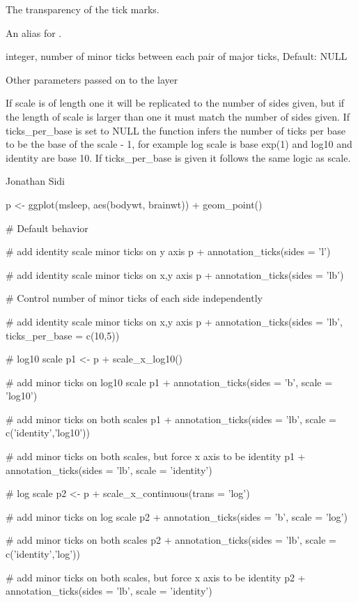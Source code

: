 \documentclass[a4paper]{book}
\begin{document}
\begin{Arguments}
\begin{ldescription}
\item[\code{alpha}] The transparency of the tick marks.

\item[\code{color}] An alias for .

\item[\code{ticks\_per\_base}] integer, number of minor ticks between each pair of major ticks, Default: NULL

\item[\code{...}] Other parameters passed on to the layer
\end{ldescription}
\end{Arguments}
%
\begin{Details}
If scale is of length one it will be replicated to the number of sides given, but if the
length of scale is larger than one it must match the number of sides given.
If ticks\_per\_base is set to NULL the function infers the number of ticks per base to be
the base of the scale - 1, for example log scale is base exp(1) and
log10 and identity are base 10. If ticks\_per\_base is given it follows the same logic as scale.
\end{Details}
%
\begin{Author}
Jonathan Sidi
\end{Author}
%
\begin{Examples}
\begin{ExampleCode}

p <- ggplot(msleep, aes(bodywt, brainwt)) + geom_point()

# Default behavior

# add identity scale minor ticks on y axis
p + annotation_ticks(sides = 'l')

# add identity scale minor ticks on x,y axis
p + annotation_ticks(sides = 'lb')

# Control number of minor ticks of each side independently

# add identity scale minor ticks on x,y axis
p + annotation_ticks(sides = 'lb', ticks_per_base = c(10,5))

# log10 scale
p1 <- p + scale_x_log10()

# add minor ticks on log10 scale
p1 + annotation_ticks(sides = 'b', scale = 'log10')

# add minor ticks on both scales
p1 + annotation_ticks(sides = 'lb', scale = c('identity','log10'))

# add minor ticks on both scales, but force x axis to be identity
p1 + annotation_ticks(sides = 'lb', scale = 'identity')

# log scale
p2 <- p + scale_x_continuous(trans = 'log')

# add minor ticks on log scale
p2 + annotation_ticks(sides = 'b', scale = 'log')

# add minor ticks on both scales
p2 + annotation_ticks(sides = 'lb', scale = c('identity','log'))

# add minor ticks on both scales, but force x axis to be identity
p2 + annotation_ticks(sides = 'lb', scale = 'identity')

\end{ExampleCode}
\end{Examples}
\end{document}
